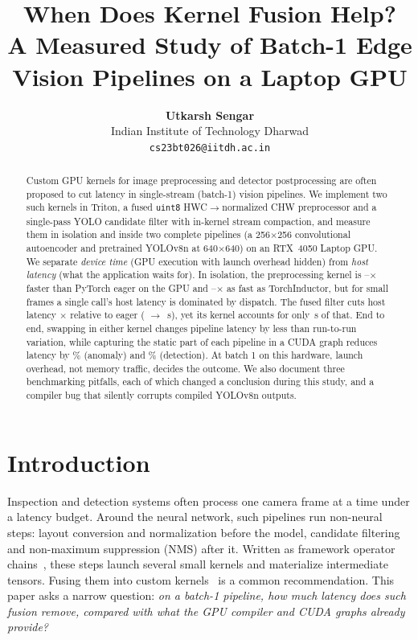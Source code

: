 \documentclass[10pt,twocolumn,letterpaper]{article}
\title{\Large\bf When Does Kernel Fusion Help?\\A Measured Study of Batch-1 Edge Vision Pipelines on a Laptop GPU}
\author{\textbf{Utkarsh Sengar}\\Indian Institute of Technology Dharwad\\\texttt{cs23bt026@iitdh.ac.in}}
\date{}
\begin{document}
\maketitle

\begin{abstract}
Custom GPU kernels for image preprocessing and detector postprocessing are often proposed to cut
latency in single-stream (batch-1) vision pipelines. We implement two such kernels in Triton, a
fused \texttt{uint8} HWC$\rightarrow$normalized CHW preprocessor and a single-pass YOLO candidate
filter with in-kernel stream compaction, and measure them in isolation and inside two complete
pipelines (a 256$\times$256 convolutional autoencoder and pretrained YOLOv8n at 640$\times$640) on
an RTX~4050 Laptop GPU. We separate \emph{device time} (GPU execution with launch overhead hidden)
from \emph{host latency} (what the application waits for). In isolation, the preprocessing kernel
is --$\times$ faster than PyTorch eager
on the GPU and --$\times$ as fast as
TorchInductor, but for small frames a single call's host latency is dominated by dispatch. The fused filter cuts
host latency $\times$ relative to eager
( $\rightarrow$ \,\textmu s), yet its kernel accounts for only
\,\textmu s of that. End to end, swapping in either
kernel changes pipeline latency by less than run-to-run variation, while capturing the static part
of each pipeline in a CUDA graph reduces latency by \%
(anomaly) and \% (detection).
At batch 1 on this hardware, launch overhead, not memory traffic, decides the outcome. We also
document three benchmarking pitfalls, each of which changed a conclusion during this study, and a
compiler bug that silently corrupts compiled YOLOv8n outputs.
\end{abstract}

\section{Introduction}
Inspection and detection systems often process one camera frame at a time under a latency budget.
Around the neural network, such pipelines run non-neural steps: layout conversion and
normalization before the model, candidate filtering and non-maximum suppression (NMS) after it.
Written as framework operator chains~\cite{paszke2019pytorch}, these steps launch several small
kernels and materialize intermediate tensors. Fusing them into custom kernels~\cite{tillet2019triton}
is a common recommendation. This paper asks a narrow question: \emph{on a batch-1 pipeline, how much
latency does such fusion remove, compared with what the GPU compiler and CUDA graphs already provide?}
\end{document}
